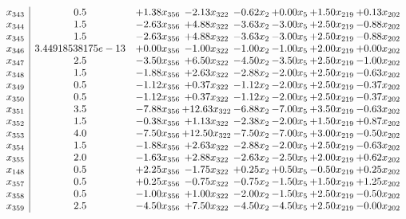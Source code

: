 \documentclass[8pt]{article}
\begin{document}
\[\begin{array}{c| c c@{\hskip 2pt} c@{\hskip 2pt} c@{\hskip 2pt} c@{\hskip 2pt} c@{\hskip 2pt} c@{\hskip 2pt} }
 x_{343}   &  0.5 & +  1.38 x_{356} & -2.13 x_{322} & -0.62 x_{2} & +  0.00 x_{5} & +  1.50 x_{219} & +  0.13 x_{202}\\
 x_{344}   &  1.5 & -2.63 x_{356} & +  4.88 x_{322} & -3.63 x_{2} & -3.00 x_{5} & +  2.50 x_{219} & -0.88 x_{202}\\
 x_{345}   &  1.5 & -2.63 x_{356} & +  4.88 x_{322} & -3.63 x_{2} & -3.00 x_{5} & +  2.50 x_{219} & -0.88 x_{202}\\
 x_{346}   &  3.44918538175e-13 & +  0.00 x_{356} & -1.00 x_{322} & -1.00 x_{2} & -1.00 x_{5} & +  2.00 x_{219} & +  0.00 x_{202}\\
 x_{347}   &  2.5 & -3.50 x_{356} & +  6.50 x_{322} & -4.50 x_{2} & -3.50 x_{5} & +  2.50 x_{219} & -1.00 x_{202}\\
 x_{348}   &  1.5 & -1.88 x_{356} & +  2.63 x_{322} & -2.88 x_{2} & -2.00 x_{5} & +  2.50 x_{219} & -0.63 x_{202}\\
 x_{349}   &  0.5 & -1.12 x_{356} & +  0.37 x_{322} & -1.12 x_{2} & -2.00 x_{5} & +  2.50 x_{219} & -0.37 x_{202}\\
 x_{350}   &  0.5 & -1.12 x_{356} & +  0.37 x_{322} & -1.12 x_{2} & -2.00 x_{5} & +  2.50 x_{219} & -0.37 x_{202}\\
 x_{351}   &  3.5 & -7.88 x_{356} & + 12.63 x_{322} & -6.88 x_{2} & -7.00 x_{5} & +  3.50 x_{219} & -0.63 x_{202}\\
 x_{352}   &  1.5 & -0.38 x_{356} & +  1.13 x_{322} & -2.38 x_{2} & -2.00 x_{5} & +  1.50 x_{219} & +  0.87 x_{202}\\
 x_{353}   &  4.0 & -7.50 x_{356} & + 12.50 x_{322} & -7.50 x_{2} & -7.00 x_{5} & +  3.00 x_{219} & -0.50 x_{202}\\
 x_{354}   &  1.5 & -1.88 x_{356} & +  2.63 x_{322} & -2.88 x_{2} & -2.00 x_{5} & +  2.50 x_{219} & -0.63 x_{202}\\
 x_{355}   &  2.0 & -1.63 x_{356} & +  2.88 x_{322} & -2.63 x_{2} & -2.50 x_{5} & +  2.00 x_{219} & +  0.62 x_{202}\\
 x_{148}   &  0.5 & +  2.25 x_{356} & -1.75 x_{322} & +  0.25 x_{2} & +  0.50 x_{5} & -0.50 x_{219} & +  0.25 x_{202}\\
 x_{357}   &  0.5 & +  0.25 x_{356} & -0.75 x_{322} & -0.75 x_{2} & -1.50 x_{5} & +  1.50 x_{219} & +  1.25 x_{202}\\
 x_{358}   &  0.5 & -1.00 x_{356} & +  1.00 x_{322} & -2.00 x_{2} & -1.50 x_{5} & +  2.50 x_{219} & -0.50 x_{202}\\
 x_{359}   &  2.5 & -4.50 x_{356} & +  7.50 x_{322} & -4.50 x_{2} & -4.50 x_{5} & +  2.50 x_{219} & -0.00 x_{202}\\

\end{array}\]
\end{document}
